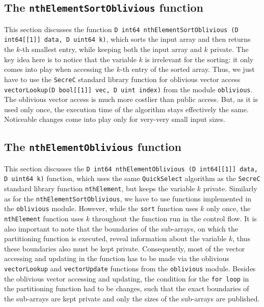 \documentclass[11pt]{article}
\newcommand{\ct}[1]{\texttt{#1}}
\newcommand{\SC}{\ct{SecreC}\xspace}
\begin{document}


\subsection{The \ct{nthElementSortOblivious} function} %
\label{sub:the_nthelementsortoblivious_function}

This section discusses the function \ct{D int64 nthElementSortOblivious (D int64[[1]] data, D uint64 k)}, which sorts the input array and then returns the $k$-th smallest entry, while keeping both the input array and $k$ private. The key idea here is to notice that the variable $k$ is irrelevant for the sorting: it only comes into play when accessing the $k$-th entry of the sorted array. Thus, we just have to use the \SC standard library function for oblivious vector access \ct{vectorLookup(D bool[[1]] vec, D uint index)} from the module \ct{oblivious}. The oblivious vector access is much more costlier than public access. But, as it is used only once, the execution time of the algorithm stays effectively the same. Noticeable changes come into play only for very-very small input sizes.



\subsection{The \ct{nthElementOblivious} function} %
\label{sub:the_nthelementoblivious_function}

This section discusses the \ct{D int64 nthElementOblivious (D int64[[1]] data, D uint64 k)} function, which uses the same \ct{QuickSelect} algorithm as the \SC standard library function \ct{nthElement}, but keeps the variable $k$ private. Similarly as for the \ct{nthElementSortOblivious}, we have to use functions implemented in the \ct{oblivious} module. However, while the \ct{sort} function uses $k$ only once, the \ct{nthElement} function uses $k$ throughout the function run in the control flow. It is also important to note that the boundaries of the sub-arrays, on which the partitioning function is executed, reveal information about the variable $k$, thus these boundaries also must be kept private. Consequently, most of the vector accessing and updating in the function has to be made via the oblivious \ct{vectorLookup} and \ct{vectorUpdate} functions from the \ct{oblivious} module. Besides the oblivious vector accessing and updating, the condition for the \ct{for loop} in the partitioning function had to be changes, such that the exact boundaries of the sub-arrays are kept private and only the sizes of the sub-arrays are published. 
\end{document}
